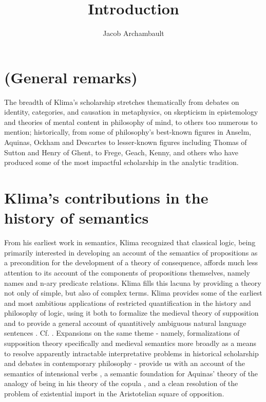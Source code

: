 \documentclass[]{article}
\title{Introduction}
\author{Jacob Archambault}
\begin{document}
\maketitle

\begin{abstract}

\end{abstract}

\section{(General remarks)}
The breadth of Klima's scholarship stretches thematically from debates on identity, categories, and causation in metaphysics, 
on skepticism in epistemology and theories of mental content in philosophy of mind, to others too numerous to mention; historically, from some of philosophy's best-known figures in Anselm, Aquinas, Ockham and Descartes 
to lesser-known figures including Thomas of Sutton and Henry of Ghent, 
to Frege, Geach, Kenny, and others who have produced some of the most impactful scholarship in the analytic tradition. 

\section{Klima's contributions in the history of semantics}
From his earliest work in semantics, 
Klima recognized that classical logic, 
being primarily interested in developing an account of the semantics of propositions as a precondition for the development of a theory of consequence, 
affords much less attention to its account of the components of propositions themselves, 
namely names and n-ary predicate relations. 
Klima fills this lacuna by providing a theory not only of simple, 
but also of complex terms.
Klima provides some of the earliest and most ambitious applications of restricted quantification in the history and philosophy of logic, 
using it both to formalize the medieval theory of supposition 
and to provide a general account of quantitively ambiguous natural language sentences \autocite{Klima1988,Klima1990,KlimaSandu1990,Klima1991b}. Cf. \autocite{Parsons2014}. 
Expansions on the same theme - 
namely, formalizations of supposition theory specifically 
and medieval semantics more broadly 
as a means to resolve apparently intractable interpretative problems in historical scholarship 
and debates in contemporary philosophy - 
provide us with an account of the semantics of intensional verbs \autocite{Klima1991}, 
a semantic foundation for Aquinas' theory of the analogy of being in his theory of the copula \autocite{Klima1996,Klima2002}, 
and a clean resolution of the problem of existential import in the Aristotelian square of opposition\autocite{Klima2001}. 
\end{document}
